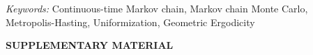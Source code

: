 \documentclass[12pt]{article}
\begin{document}
\noindent%
{\it Keywords:}  Continuous-time Markov chain, Markov chain Monte Carlo, 
Metropolis-Hasting, Uniformization, Geometric Ergodicity 
\vfill

\newpage
{} %


 
 
 
 
 
 
 

\bigskip
\begin{center}
{\large\bf SUPPLEMENTARY MATERIAL}
\end{center}




%


\end{document}
